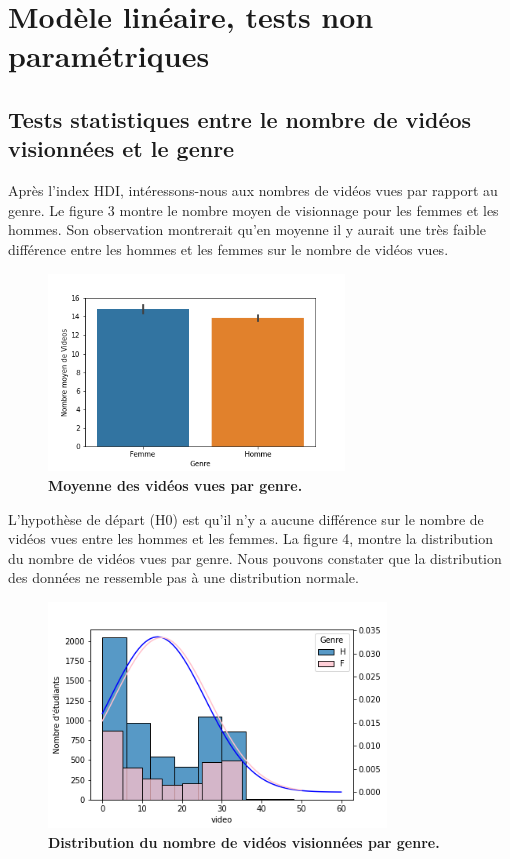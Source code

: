 \documentclass[12pt, a4paper, titlepage, table]{article}
\begin{document}
\section{Modèle linéaire, tests non paramétriques}
\subsection{Tests statistiques entre le nombre de vidéos visionnées et le genre}

Après l'index HDI, intéressons-nous aux nombres de vidéos vues par rapport au genre. Le figure 3 montre le nombre moyen de visionnage pour les femmes et 
les hommes. Son observation montrerait qu'en moyenne il y aurait une très faible différence entre les hommes et les femmes sur le nombre de vidéos vues. 

	\begin{figure}[H]
		\centering
		\includegraphics[width=0.7\textwidth]{../../graph/mean_video.png}
		\caption{\textbf{Moyenne des vidéos vues par genre.}}
	\end{figure}

L'hypothèse de départ (H0) est qu'il n'y a aucune différence sur le nombre de vidéos vues entre les hommes et les femmes. La figure 4, montre la distribution du nombre de vidéos vues par genre. Nous pouvons constater que la distribution des données ne ressemble pas à une distribution normale.

	\begin{figure}[H]
		\centering
		\includegraphics[width=0.8\textwidth]{../../graph/distribution_video.png}
		\caption{\textbf{Distribution du nombre de vidéos visionnées par genre.}}
	\end{figure}
\end{document}
